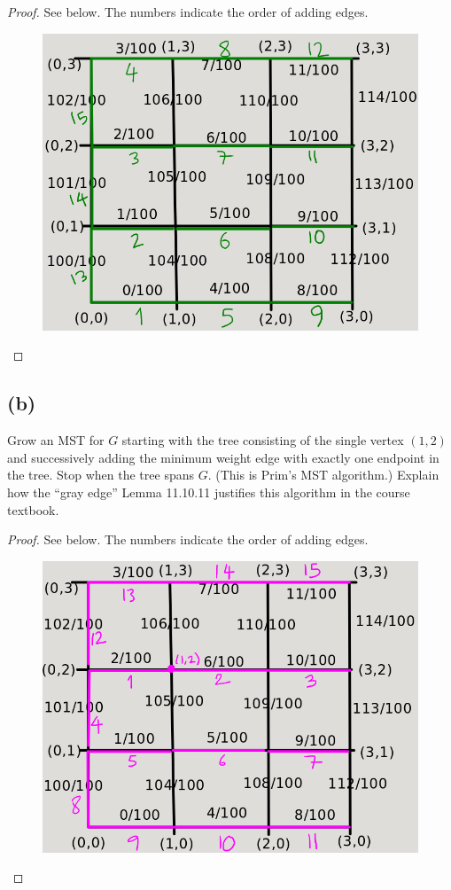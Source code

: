\documentclass[14pt]{extarticle}
\begin{document}
\begin{proof} See below. The numbers indicate the order of adding edges.
\begin{figure}[ht!]
\centering
\includegraphics[scale=0.5]{mst-2.png}
\end{figure}
\end{proof}

\subsection{(b)}
Grow an MST for $G$ starting with the tree consisting of the single vertex $(1, 2)$ and successively adding the minimum weight edge with exactly one endpoint in the tree. Stop when the tree spans $G$. (This is Prim’s MST algorithm.) Explain how the “gray edge” Lemma 11.10.11 justifies this algorithm in the course textbook.

\begin{proof} See below. The numbers indicate the order of adding edges.
\begin{figure}[ht!]
\centering
\includegraphics[scale=0.5]{mst-3.png}
\end{figure}
\end{proof}
\end{document}

